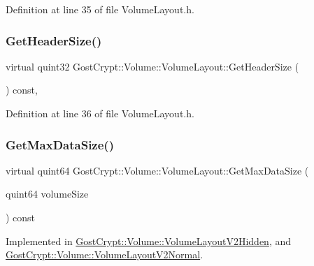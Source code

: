 Definition at line 35 of file Volume\+Layout.\+h.

\mbox{\label{class_gost_crypt_1_1_volume_1_1_volume_layout_ac4c7306881a87c199d6a03edda253325}} 
\subsubsection{\texorpdfstring{Get\+Header\+Size()}{GetHeaderSize()}}
{\footnotesize\ttfamily virtual quint32 Gost\+Crypt\+::\+Volume\+::\+Volume\+Layout\+::\+Get\+Header\+Size (\begin{DoxyParamCaption}{ }\end{DoxyParamCaption}) const\hspace{0.3cm}{\ttfamily [inline]}, {\ttfamily [virtual]}}



Definition at line 36 of file Volume\+Layout.\+h.

\mbox{\label{class_gost_crypt_1_1_volume_1_1_volume_layout_a55eb89c0c90553250e50138c990bbfac}} 
\subsubsection{\texorpdfstring{Get\+Max\+Data\+Size()}{GetMaxDataSize()}}
{\footnotesize\ttfamily virtual quint64 Gost\+Crypt\+::\+Volume\+::\+Volume\+Layout\+::\+Get\+Max\+Data\+Size (\begin{DoxyParamCaption}\item[{quint64}]{volume\+Size }\end{DoxyParamCaption}) const\hspace{0.3cm}{\ttfamily [pure virtual]}}



Implemented in \hyperlink{class_gost_crypt_1_1_volume_1_1_volume_layout_v2_hidden_a784f7b8296b7b253f8255a124c977de0}{Gost\+Crypt\+::\+Volume\+::\+Volume\+Layout\+V2\+Hidden}, and \hyperlink{class_gost_crypt_1_1_volume_1_1_volume_layout_v2_normal_a6514185db235a650e86fc25ef7daa10c}{Gost\+Crypt\+::\+Volume\+::\+Volume\+Layout\+V2\+Normal}.

